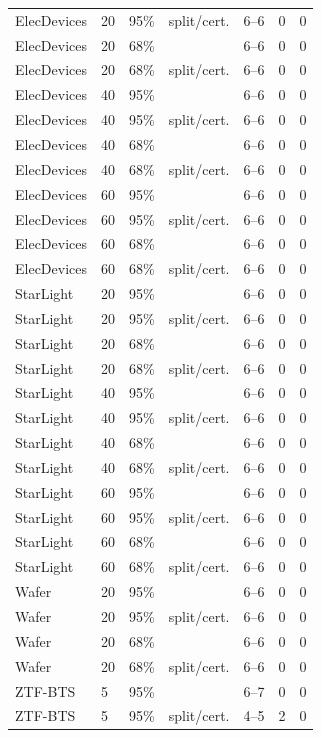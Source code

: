 \begin{longtable}{llllccc}
ElecDevices & 20 & 95\% & split/cert. & 6--6 & 0 & 0 \\
ElecDevices & 20 & 68\% & \gamut{} & 6--6 & 0 & 0 \\
ElecDevices & 20 & 68\% & split/cert. & 6--6 & 0 & 0 \\
ElecDevices & 40 & 95\% & \gamut{} & 6--6 & 0 & 0 \\
ElecDevices & 40 & 95\% & split/cert. & 6--6 & 0 & 0 \\
ElecDevices & 40 & 68\% & \gamut{} & 6--6 & 0 & 0 \\
ElecDevices & 40 & 68\% & split/cert. & 6--6 & 0 & 0 \\
ElecDevices & 60 & 95\% & \gamut{} & 6--6 & 0 & 0 \\
ElecDevices & 60 & 95\% & split/cert. & 6--6 & 0 & 0 \\
ElecDevices & 60 & 68\% & \gamut{} & 6--6 & 0 & 0 \\
ElecDevices & 60 & 68\% & split/cert. & 6--6 & 0 & 0 \\
StarLight & 20 & 95\% & \gamut{} & 6--6 & 0 & 0 \\
StarLight & 20 & 95\% & split/cert. & 6--6 & 0 & 0 \\
StarLight & 20 & 68\% & \gamut{} & 6--6 & 0 & 0 \\
StarLight & 20 & 68\% & split/cert. & 6--6 & 0 & 0 \\
StarLight & 40 & 95\% & \gamut{} & 6--6 & 0 & 0 \\
StarLight & 40 & 95\% & split/cert. & 6--6 & 0 & 0 \\
StarLight & 40 & 68\% & \gamut{} & 6--6 & 0 & 0 \\
StarLight & 40 & 68\% & split/cert. & 6--6 & 0 & 0 \\
StarLight & 60 & 95\% & \gamut{} & 6--6 & 0 & 0 \\
StarLight & 60 & 95\% & split/cert. & 6--6 & 0 & 0 \\
StarLight & 60 & 68\% & \gamut{} & 6--6 & 0 & 0 \\
StarLight & 60 & 68\% & split/cert. & 6--6 & 0 & 0 \\
Wafer & 20 & 95\% & \gamut{} & 6--6 & 0 & 0 \\
Wafer & 20 & 95\% & split/cert. & 6--6 & 0 & 0 \\
Wafer & 20 & 68\% & \gamut{} & 6--6 & 0 & 0 \\
Wafer & 20 & 68\% & split/cert. & 6--6 & 0 & 0 \\
ZTF-BTS & 5 & 95\% & \gamut{} & 6--7 & 0 & 0 \\
ZTF-BTS & 5 & 95\% & split/cert. & 4--5 & 2 & 0 \\

\end{longtable}
